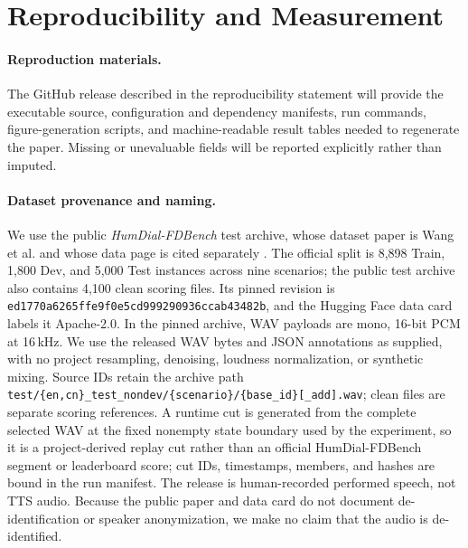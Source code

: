 
\clearpage
\appendix

\section{Reproducibility and Measurement}
\label{app:protocol}

\paragraph{Reproduction materials.} The GitHub release described in the
reproducibility statement will provide the executable source, configuration
and dependency manifests, run commands, figure-generation scripts, and
machine-readable result tables needed to regenerate the paper. Missing or
unevaluable fields will be reported explicitly rather than imputed.

\paragraph{Dataset provenance and naming.} We use the public
\emph{HumDial-FDBench} test archive, whose dataset paper is Wang et al.
\citep{humdial2026} and whose data page is cited separately
\citep{humdialdataset2026}. The official split is 8,898 Train, 1,800 Dev,
and 5,000 Test instances across nine scenarios; the public test archive also
contains 4,100 clean scoring files. Its pinned revision is
\texttt{ed1770a6265ffe9f0e5cd999290936ccab43482b}, and the Hugging Face data
card labels it Apache-2.0. In the pinned archive, WAV payloads are mono,
16-bit PCM at 16\,kHz. We use the released WAV bytes and JSON annotations as
supplied, with no project resampling, denoising, loudness normalization, or
synthetic mixing. Source IDs retain the archive path
\texttt{test/\{en,cn\}\_test\_nondev/\{scenario\}/\{base\_id\}[\_add].wav};
clean files are separate scoring references. A runtime cut is generated from
the complete selected WAV at the fixed nonempty state boundary used by the
experiment, so it is a project-derived replay cut rather than an official
HumDial-FDBench segment or leaderboard score; cut IDs, timestamps, members,
and hashes are bound in the run manifest. The release is human-recorded
performed speech, not TTS audio. Because the public paper and data card do
not document de-identification or speaker anonymization, we make no claim
that the audio is de-identified.

